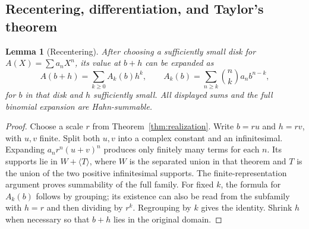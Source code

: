 \documentclass[11pt,a4paper]{article}
\numberwithin{equation}{section}
\newtheorem{lemma}[theorem]{Lemma}
\theoremstyle{definition}
\theoremstyle{remark}
\begin{document}
\subsection{Recentering, differentiation, and Taylor's theorem}
\begin{lemma}[Recentering]
\label{lem:recenter}
After choosing a sufficiently small disk for $A(X)=\sum a_nX^n$, its value at $b+h$ can be expanded as
\[
 A(b+h)=\sum_{k\geq0}A_k(b)h^k,
 \qquad A_k(b)=\sum_{n\geq k}\binom nk a_nb^{n-k},
\]
for $b$ in that disk and $h$ sufficiently small. All displayed sums and the full binomial expansion are Hahn-summable.
\end{lemma}
\begin{proof}
Choose a scale $r$ from Theorem~\ref{thm:realization}. Write $b=ru$ and $h=rv$, with $u,v$ finite. Split both $u,v$ into a complex constant and an infinitesimal. Expanding $a_nr^n(u+v)^n$ produces only finitely many terms for each $n$. Its supports lie in $W+\langle T\rangle$, where $W$ is the separated union in that theorem and $T$ is the union of the two positive infinitesimal supports. The finite-representation argument proves summability of the full family. For fixed $k$, the formula for $A_k(b)$ follows by grouping; its existence can also be read from the subfamily with $h=r$ and then dividing by $r^k$. Regrouping by $k$ gives the identity. Shrink $h$ when necessary so that $b+h$ lies in the original domain.
\end{proof}
\end{document}

